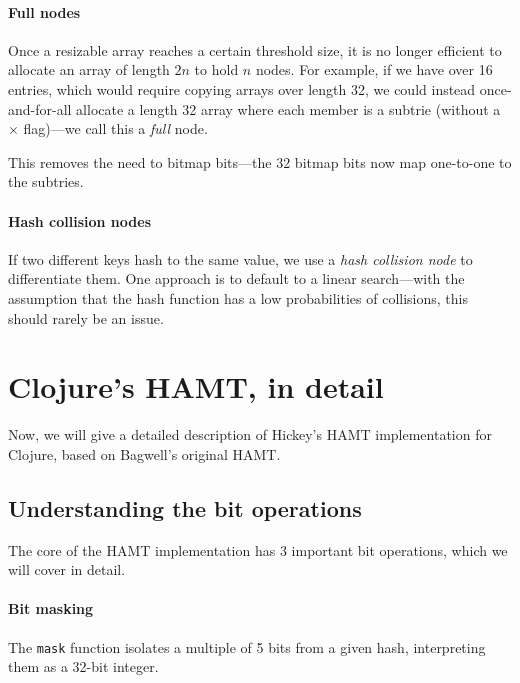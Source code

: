 \documentclass[preprint]{sigplanconf}
\begin{document}
\paragraph{Full nodes}
Once a resizable array reaches a certain threshold
size, it is no longer efficient to allocate
an array of length $2n$ to hold $n$ nodes.
For example, if we have over 16 entries, which
would require copying arrays over length 32, we could
instead once-and-for-all allocate a length 32
array where each member is a subtrie
(without a $\times$ flag)---we call this a \textit{full}
node.

This removes the need to bitmap bits---the
32 bitmap bits now map one-to-one to the subtries.

\paragraph{Hash collision nodes}
If two different keys hash to the same value,
we use a \textit{hash collision node}
to differentiate them. One approach
is to default to a linear search---with
the assumption that the hash function
has a low probabilities of collisions,
this should rarely be an issue.


\section{Clojure's HAMT, in detail}
\label{clojure-hamt}

Now, we will give a detailed description of
Hickey's HAMT implementation for Clojure, based
on Bagwell's original HAMT.

\subsection{Understanding the bit operations}

The core of the HAMT implementation has 3 important
bit operations, which we will cover in detail.

\paragraph{Bit masking}

The \texttt{mask} function isolates a multiple of
5 bits from a given hash, interpreting them as
a 32-bit integer.
\end{document}

